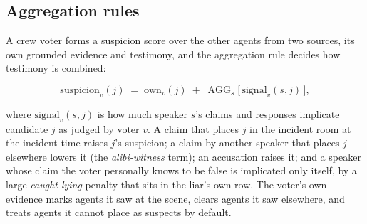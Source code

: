 \documentclass[
  12pt,
]{article}
\begin{document}
\subsection{Aggregation rules}\label{aggregation-rules}

A crew voter forms a suspicion score over the other agents from two
sources, its own grounded evidence and testimony, and the aggregation
rule decides how testimony is combined:

\[
\text{suspicion}_v(j) \;=\; \text{own}_v(j) \;+\; \operatorname{AGG}_{s}\big[\,\text{signal}_v(s, j)\,\big],
\]

where \(\text{signal}_v(s, j)\) is how much speaker \(s\)'s claims and
responses implicate candidate \(j\) as judged by voter \(v\). A claim
that places \(j\) in the incident room at the incident time raises
\(j\)'s suspicion; a claim by another speaker that places \(j\)
elsewhere lowers it (the \emph{alibi-witness} term); an accusation
raises it; and a speaker whose claim the voter personally knows to be
false is implicated only itself, by a large \emph{caught-lying} penalty
that sits in the liar's own row. The voter's own evidence marks agents
it saw at the scene, clears agents it saw elsewhere, and treats agents
it cannot place as suspects by default.
\end{document}
